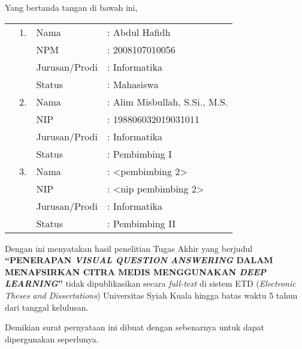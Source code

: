 \spernyataan %

\noindent
Yang bertanda tangan di bawah ini,
\vspace{-0.1cm}
\begin{table}[H]
{\renewcommand{\arraystretch}{0.7}
\begin{tabular}{M{0.6cm}lll}
	&1. 	& Nama   		&: Abdul Hafidh \\
	&	& NPM       			&: 2008107010056   \\
	&	& Jurusan/Prodi   		&: Informatika \\
	&	& Status 				&: Mahasiswa \\  
	&2. 	& Nama  		&: Alim Misbullah, S.Si., M.S. \\
	&	& NIP       			&: 198806032019031011    \\
	&	& Jurusan/Prodi   		&: Informatika \\
	&	& Status 				&: Pembimbing I \\  
	&3. 	& Nama  		&: <pembimbing 2> \\
	&	& NIP       			&: <nip pembimbing 2>   \\
	&	& Jurusan/Prodi   		&: Informatika \\
	&	& Status 				&: Pembimbing II   
\end{tabular}
}
\end{table}
\vspace{-0.4cm}
\noindent
Dengan ini menyatakan hasil penelitian Tugas Akhir yang berjudul \textbf{“PENERAPAN \textit{VISUAL QUESTION ANSWERING} DALAM MENAFSIRKAN CITRA MEDIS MENGGUNAKAN \textit{DEEP LEARNING}”} tidak dipublikasikan secara \textit{full-text} di sistem ETD (\textit{Electronic Theses and Dissertations}) Universitas Syiah Kuala hingga batas waktu 5 tahun dari tanggal kelulusan.

\vspace{0.4cm}
\noindent
Demikian surat pernyataan ini dibuat dengan sebenarnya untuk dapat dipergunakan seperlunya.

